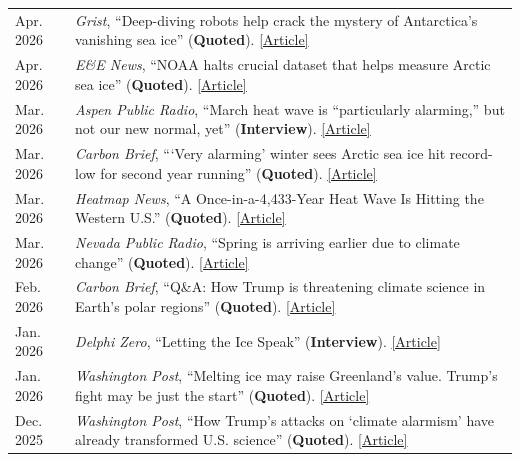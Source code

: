 \documentclass[margin,line,palatino,courier,10pt]{res}
\begin{document}
\begin{resume}
\begin{tabular}{@{}p{0.9in}p{4in}}
Apr. 2026 & \textit{Grist}, ``Deep-diving robots help crack the mystery of Antarctica's vanishing sea ice'' (\textbf{Quoted}). \href{https://grist.org/oceans/deep-diving-robots-help-crack-the-mystery-of-antarcticas-vanishing-sea-ice/}{[Article]}\\
Apr. 2026 & \textit{E\&E News}, ``NOAA halts crucial dataset that helps measure Arctic sea ice'' (\textbf{Quoted}). \href{https://www.eenews.net/articles/noaa-halts-crucial-dataset-that-helps-measure-arctic-sea-ice/}{[Article]}\\
Mar. 2026 & \textit{Aspen Public Radio}, ``March heat wave is ``particularly alarming,'' but not our new normal, yet'' (\textbf{Interview}). \href{https://www.aspenpublicradio.org/environment/2026-03-27/march-heat-wave-is-particularly-alarming-but-not-our-new-normal-yet}{[Article]}\\
Mar. 2026 & \textit{Carbon Brief}, ```Very alarming' winter sees Arctic sea ice hit record-low for second year running'' (\textbf{Quoted}). \href{https://www.carbonbrief.org/very-alarming-winter-sees-arctic-sea-ice-hit-record-low-for-second-year-running/}{[Article]}\\
Mar. 2026 & \textit{Heatmap News}, ``A Once-in-a-4,433-Year Heat Wave Is Hitting the Western U.S.'' (\textbf{Quoted}). \href{https://heatmap.news/climate/march-heat-wave}{[Article]}\\
Mar. 2026 & \textit{Nevada Public Radio}, ``Spring is arriving earlier due to climate change'' (\textbf{Quoted}). \href{https://knpr.org/2026-03-06/spring-is-arriving-earlier-due-to-climate-change}{[Article]}\\
Feb. 2026 & \textit{Carbon Brief}, ``Q\&A: How Trump is threatening climate science in Earth's polar regions'' (\textbf{Quoted}). \href{https://www.carbonbrief.org/qa-how-trump-is-threatening-climate-science-in-earths-polar-regions/}{[Article]}\\
Jan. 2026 & \textit{Delphi Zero}, ``Letting the Ice Speak'' (\textbf{Interview}). \href{https://delphizero.substack.com/p/zack}{[Article]}\\
Jan. 2026 & \textit{Washington Post}, ``Melting ice may raise Greenland’s value. Trump’s fight may be just the start'' (\textbf{Quoted}). \href{https://www.washingtonpost.com/climate-environment/2026/01/18/melting-arctic-greenland-trump-2/}{[Article]}\\
Dec. 2025 & \textit{Washington Post}, ``How Trump's attacks on `climate alarmism' have already transformed U.S. science'' (\textbf{Quoted}). \href{https://www.washingtonpost.com/climate-environment/2025/12/24/trump-climate-science-funding-cuts/}{[Article]}\\

\end{tabular}
\end{resume}
\end{document}
